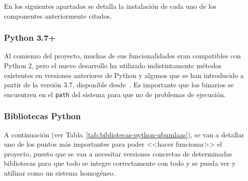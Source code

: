En los siguientes apartados se detalla la instalación de cada uno de los componentes anteriormente citados.

\subsubsection{Python 3.7+}
Al comienzo del proyecto, muchas de sus funcionalidades eran compatibles con Python 2, pero el nuevo desarrollo ha utilizado indistintamente métodos existentes en versiones anteriores de Python y algunos que se han introducido a partir de la versión 3.7, disponible desde~\cite{pythonGetIt}. Es importante que los binarios se encuentren en el \texttt{path} del sistema para que no de problemas de ejecución.

\subsubsection{Bibliotecas Python}
A continuación (ver Tabla~\ref{tab:bibliotecas-python-ubumlaas}), se van a detallar uno de los puntos más importantes para poder <<hacer funcionar>> el proyecto, puesto que se van a necesitar versiones concretas de determinadas bibliotecas para que todo se integre correctamente con todo y se pueda ver y utilizar como un sistema homogéneo.

